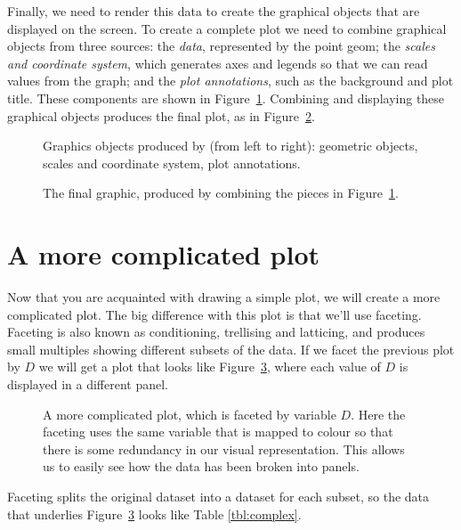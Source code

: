 Finally, we need to render this data to create the graphical objects that are displayed on the screen.  To create a complete plot we need to combine graphical objects from three sources: the \emph{data}, represented by the point geom; the \emph{scales and coordinate system}, which generates axes and legends so that we can read values from the graph; and the \emph{plot annotations}, such as the background and plot title.  These components are shown in Figure~\ref{fig:simple-exploded}.  Combining and displaying these graphical objects produces the final plot, as in Figure~\ref{fig:simple}.

\begin{figure}[htbp]
  \centering
  \caption{Graphics objects produced by (from left to right): geometric objects, scales and coordinate system, plot annotations.}
  \label{fig:simple-exploded}
\end{figure}

\begin{figure}[htbp]
  \centering
  \caption{The final graphic, produced by combining the pieces in Figure~\ref{fig:simple-exploded}.}
  \label{fig:simple}
\end{figure}

\section{A more complicated plot}
\label{sec:complex-plot} 

Now that you are acquainted with drawing a simple plot, we will create a more complicated plot.  The big difference with this plot is that we'll use faceting.  Faceting is also known as conditioning, trellising and latticing, and produces small multiples showing different subsets of the data.  If we facet the previous plot by $D$ we will get a plot that looks like Figure~\ref{fig:complex}, where each value of $D$ is displayed in a different panel.

\begin{figure}[htbp]
  \centering
  \caption{A more complicated plot, which is faceted by variable $D$.  Here the faceting uses the same variable that is mapped to colour so that there is some redundancy in our visual representation.  This allows us to easily see how the data has been broken into panels.}
  \label{fig:complex}
\end{figure}

Faceting splits the original dataset into a dataset for each subset, so the data that underlies Figure~\ref{fig:complex} looks like Table \ref{tbl:complex}.

